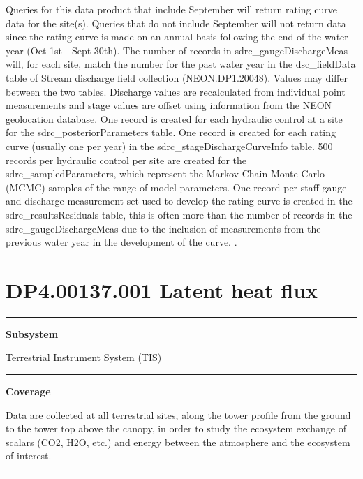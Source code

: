 \documentclass[]{article}
\begin{document}
Queries for this data product that include September will return rating
curve data for the site(s). Queries that do not include September will
not return data since the rating curve is made on an annual basis
following the end of the water year (Oct 1st - Sept 30th). The number of
records in sdrc\_gaugeDischargeMeas will, for each site, match the
number for the past water year in the dsc\_fieldData table of Stream
discharge field collection (NEON.DP1.20048). Values may differ between
the two tables. Discharge values are recalculated from individual point
measurements and stage values are offset using information from the NEON
geolocation database. One record is created for each hydraulic control
at a site for the sdrc\_posteriorParameters table. One record is created
for each rating curve (usually one per year) in the
sdrc\_stageDischargeCurveInfo table. 500 records per hydraulic control
per site are created for the sdrc\_sampledParameters, which represent
the Markov Chain Monte Carlo (MCMC) samples of the range of model
parameters. One record per staff gauge and discharge measurement set
used to develop the rating curve is created in the
sdrc\_resultsResiduals table, this is often more than the number of
records in the sdrc\_gaugeDischargeMeas due to the inclusion of
measurements from the previous water year in the development of the
curve. \newpage
.

\section{DP4.00137.001 Latent heat
flux}\label{dp4.00137.001-latent-heat-flux}

\begin{center}\rule{0.5\linewidth}{\linethickness}\end{center}

\textbf{Subsystem}

Terrestrial Instrument System (TIS)

\begin{center}\rule{0.5\linewidth}{\linethickness}\end{center}

\textbf{Coverage}

Data are collected at all terrestrial sites, along the tower profile
from the ground to the tower top above the canopy, in order to study the
ecosystem exchange of scalars (CO2, H2O, etc.) and energy between the
atmosphere and the ecosystem of interest.

\begin{center}\rule{0.5\linewidth}{\linethickness}\end{center}
\end{document}
